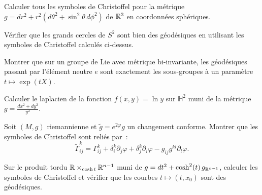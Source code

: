 \begin{exercice}
Calculer tous les symboles de Christoffel pour la m\'etrique
$g = dr^2 + r^2(d\theta^2 + \sin^2\!\theta\, d\phi^2)$ de $\mathbb{R}^3$ en coordonn\'ees
sph\'eriques.
\end{exercice}

\begin{exercice}
V\'erifier que les grands cercles de $S^2$ sont bien des g\'eod\'esiques en utilisant
les symboles de Christoffel calcul\'es ci-dessus.
\end{exercice}

\begin{exercice}
Montrer que sur un groupe de Lie avec m\'etrique bi-invariante, les g\'eod\'esiques
passant par l'\'el\'ement neutre $e$ sont exactement les sous-groupes \`a un param\`etre
$t \mapsto \exp(tX)$.
\end{exercice}

\begin{exercice}
Calculer le laplacien de la fonction $f(x,y) = \ln y$ sur $\mathbb{H}^2$ muni
de la m\'etrique $g = \frac{dx^2 + dy^2}{y^2}$.
\end{exercice}

\begin{exercice}
Soit $(M, g)$ riemannienne et $\tilde{g} = e^{2\varphi} g$ un changement conforme.
Montrer que les symboles de Christoffel sont reli\'es par~:
\[
    \tilde{\Gamma}^k_{ij} = \Gamma^k_{ij} + \delta^k_i \partial_j \varphi
    + \delta^k_j \partial_i \varphi - g_{ij} g^{kl} \partial_l \varphi.
\]
\end{exercice}

\begin{exercice}
Sur le produit tordu $\mathbb{R} \times_{\cosh t} \mathbb{R}^{n-1}$ muni de
$g = dt^2 + \cosh^2(t)\, g_{\mathbb{R}^{n-1}}$, calculer les symboles de Christoffel
et v\'erifier que les courbes $t \mapsto (t, x_0)$ sont des g\'eod\'esiques.
\end{exercice}
